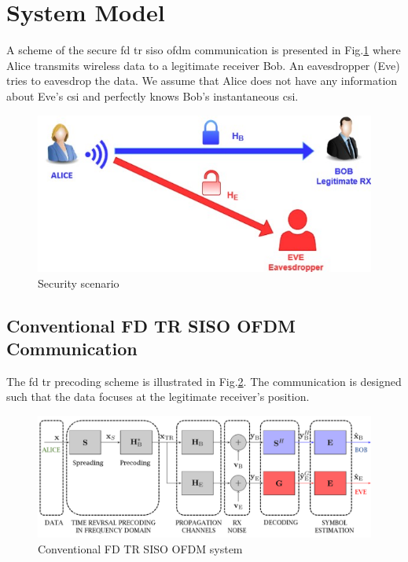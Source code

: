\section{System Model}
A scheme of the secure \gls{fd} \gls{tr} \gls{siso} \gls{ofdm} communication is presented in Fig.\ref{fig:A_B_E_scheme} where Alice transmits wireless data to a legitimate receiver Bob. An eavesdropper (Eve) tries to eavesdrop the data. We assume that Alice does not have any information about Eve's \gls{csi} and perfectly knows Bob's instantaneous \gls{csi}. 
\begin{figure}[h!]
    \centering
    \includegraphics[width=.5\linewidth]{img/a_b_e_scheme.jpg}
    \caption{Security scenario}
    \label{fig:A_B_E_scheme}
\end{figure} 




\subsection{Conventional FD TR SISO OFDM Communication}
The \gls{fd} \gls{tr} precoding scheme is illustrated in Fig.\ref{fig:TR_FD_classical}.  The communication is designed such that the data focuses at the legitimate receiver's position. 
\begin{figure}[h!]
    \centering
    \includegraphics[width=1\linewidth]{img/Capture.PNG}
    \caption{Conventional FD TR SISO OFDM system}
    \label{fig:TR_FD_classical}
\end{figure} 


